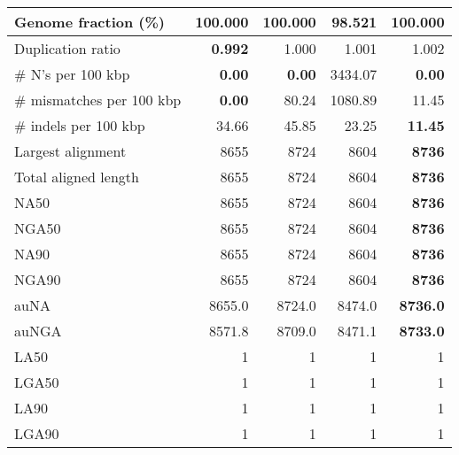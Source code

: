 \documentclass[12pt,a4paper]{article}
\begin{document}
\begin{table}[ht]
\begin{center}
\begin{tabular}{|l*{4}{|r}|}
Genome fraction (\%) & {\bf 100.000} & {\bf 100.000} & 98.521 & {\bf 100.000} \\ \hline
Duplication ratio & {\bf 0.992} & 1.000 & 1.001 & 1.002 \\ \hline
\# N's per 100 kbp & {\bf 0.00} & {\bf 0.00} & 3434.07 & {\bf 0.00} \\ \hline
\# mismatches per 100 kbp & {\bf 0.00} & 80.24 & 1080.89 & 11.45 \\ \hline
\# indels per 100 kbp & 34.66 & 45.85 & 23.25 & {\bf 11.45} \\ \hline
Largest alignment & 8655 & 8724 & 8604 & {\bf 8736} \\ \hline
Total aligned length & 8655 & 8724 & 8604 & {\bf 8736} \\ \hline
NA50 & 8655 & 8724 & 8604 & {\bf 8736} \\ \hline
NGA50 & 8655 & 8724 & 8604 & {\bf 8736} \\ \hline
NA90 & 8655 & 8724 & 8604 & {\bf 8736} \\ \hline
NGA90 & 8655 & 8724 & 8604 & {\bf 8736} \\ \hline
auNA & 8655.0 & 8724.0 & 8474.0 & {\bf 8736.0} \\ \hline
auNGA & 8571.8 & 8709.0 & 8471.1 & {\bf 8733.0} \\ \hline
LA50 & 1 & 1 & 1 & 1 \\ \hline
LGA50 & 1 & 1 & 1 & 1 \\ \hline
LA90 & 1 & 1 & 1 & 1 \\ \hline
LGA90 & 1 & 1 & 1 & 1 \\ \hline
\end{tabular}
\end{center}
\end{table}
\end{document}
